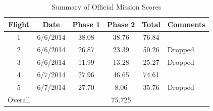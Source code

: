 \documentclass[11pt]{article}
\begin{document}
\begin{table}[!ht]
\caption{Summary of Official Mission Scores}
\label{tab:ScoreSummary}
\begin{center}
    \begin{tabular}{ | c | c | c | c | c | p{3cm} |}
    \hline
    \textbf{Flight} & \textbf{Date} & \textbf{Phase 1} & \textbf{Phase 2} & \textbf{Total} & \textbf{Comments} \\ \hline
    1 & 6/6/2014 & 38.08 & 38.76 & 76.84 & \\ \hline
    2 & 6/6/2014 & 26.87 & 23.39 & 50.26 & Dropped\\ \hline
    3 & 6/6/2014 & 11.99 & 13.28 & 25.27 & Dropped\\ \hline
    4 & 6/7/2014 & 27.96 & 46.65 & 74.61 & \\ \hline
    5 & 6/7/2014 & 27.70 & 8.06 & 35.76 & Dropped\\ \hline
    Overall & \multicolumn{5}{c|}{75.725}\\ \hline   
    \end{tabular}
\end{center}
\end{table}
\end{document}
